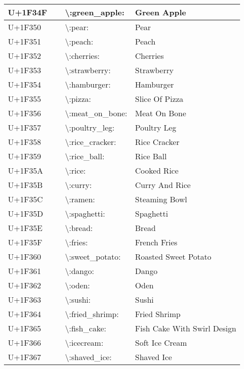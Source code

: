 \begin{table}[h]
\begin{tabulary}{\linewidth}{|L|L|L|L|}
\hline
U+1F34F & 🍏 & {\textbackslash}:green\_apple: & Green Apple \\
\hline
U+1F350 & 🍐 & {\textbackslash}:pear: & Pear \\
\hline
U+1F351 & 🍑 & {\textbackslash}:peach: & Peach \\
\hline
U+1F352 & 🍒 & {\textbackslash}:cherries: & Cherries \\
\hline
U+1F353 & 🍓 & {\textbackslash}:strawberry: & Strawberry \\
\hline
U+1F354 & 🍔 & {\textbackslash}:hamburger: & Hamburger \\
\hline
U+1F355 & 🍕 & {\textbackslash}:pizza: & Slice Of Pizza \\
\hline
U+1F356 & 🍖 & {\textbackslash}:meat\_on\_bone: & Meat On Bone \\
\hline
U+1F357 & 🍗 & {\textbackslash}:poultry\_leg: & Poultry Leg \\
\hline
U+1F358 & 🍘 & {\textbackslash}:rice\_cracker: & Rice Cracker \\
\hline
U+1F359 & 🍙 & {\textbackslash}:rice\_ball: & Rice Ball \\
\hline
U+1F35A & 🍚 & {\textbackslash}:rice: & Cooked Rice \\
\hline
U+1F35B & 🍛 & {\textbackslash}:curry: & Curry And Rice \\
\hline
U+1F35C & 🍜 & {\textbackslash}:ramen: & Steaming Bowl \\
\hline
U+1F35D & 🍝 & {\textbackslash}:spaghetti: & Spaghetti \\
\hline
U+1F35E & 🍞 & {\textbackslash}:bread: & Bread \\
\hline
U+1F35F & 🍟 & {\textbackslash}:fries: & French Fries \\
\hline
U+1F360 & 🍠 & {\textbackslash}:sweet\_potato: & Roasted Sweet Potato \\
\hline
U+1F361 & 🍡 & {\textbackslash}:dango: & Dango \\
\hline
U+1F362 & 🍢 & {\textbackslash}:oden: & Oden \\
\hline
U+1F363 & 🍣 & {\textbackslash}:sushi: & Sushi \\
\hline
U+1F364 & 🍤 & {\textbackslash}:fried\_shrimp: & Fried Shrimp \\
\hline
U+1F365 & 🍥 & {\textbackslash}:fish\_cake: & Fish Cake With Swirl Design \\
\hline
U+1F366 & 🍦 & {\textbackslash}:icecream: & Soft Ice Cream \\
\hline
U+1F367 & 🍧 & {\textbackslash}:shaved\_ice: & Shaved Ice \\

\end{tabulary}
\end{table}
